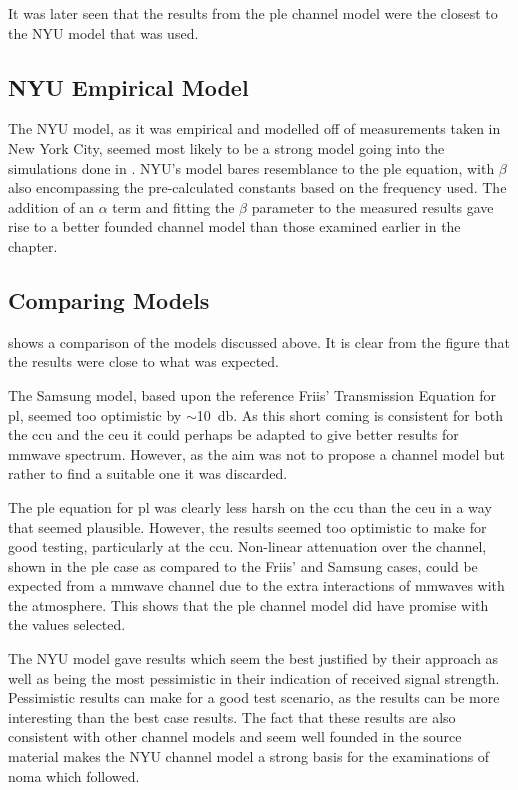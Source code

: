 \par
It was later seen that the results from the \ac{ple} channel model were the closest to the NYU model that was used.

\subsection{NYU Empirical Model}
The NYU model, as it was empirical and modelled off of measurements taken in New York City, seemed most likely to be a strong model going into the simulations done in .
NYU's model bares resemblance to the \ac{ple} equation, with $\beta$ also encompassing the pre-calculated constants based on the frequency used.
The addition of an $\alpha$ term and fitting the $\beta$ parameter to the measured results gave rise to a better founded channel model than those examined earlier in the chapter.

\subsection{Comparing Models}
 shows a comparison of the models discussed above.
It is clear from the figure that the results were close to what was expected.

\par
The Samsung model, based upon the reference Friis' Transmission Equation for \ac{pl}, seemed too optimistic by $\sim$\SI{10}{\decibel}.
As this short coming is consistent for both the \ac{ccu} and the \ac{ceu} it could perhaps be adapted to give better results for \ac{mmwave} spectrum.
However, as the aim was not to propose a channel model but rather to find a suitable one it was discarded.

\par
The \ac{ple} equation for \ac{pl} was clearly less harsh on the \ac{ccu} than the \ac{ceu} in a way that seemed plausible.
However, the results seemed too optimistic to make for good testing, particularly at the \ac{ccu}.
Non-linear attenuation over the channel, shown in the \ac{ple} case as compared to the Friis' and Samsung cases, could be expected from a \ac{mmwave} channel due to the extra interactions of \acp{mmwave} with the atmosphere.
This shows that the \ac{ple} channel model did have promise with the values selected.

\par
The NYU model gave results which seem the best justified by their approach as well as being the most pessimistic in their indication of received signal strength.
Pessimistic results can make for a good test scenario, as the results can be more interesting than the best case results.
The fact that these results are also consistent with other channel models and seem well founded in the source material makes the NYU channel model a strong basis for the examinations of \ac{noma} which followed.

